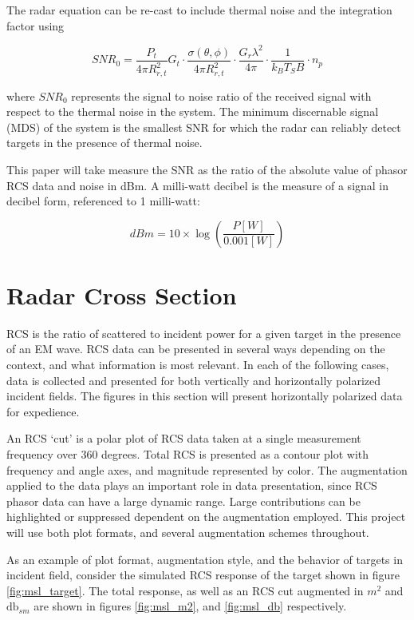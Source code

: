 	The radar equation can be re-cast to include thermal noise and the integration factor using

	\begin{equation}\label{eq:re_snr}
		SNR_0 = \frac{P_t}{4 \pi R_{r, t}^2}G_t
		\cdot \frac{\sigma(\theta, \phi)}{4 \pi R_{r, t}^2}
		\cdot \frac{G_r \lambda^2}{4 \pi}
		\cdot \frac{1}{k_B T_S B}
		\cdot n_p
	\end{equation}

	where $SNR_0$ represents the signal to noise ratio of the received signal with respect to the thermal noise in the system. The minimum discernable signal (MDS) of the system is the smallest SNR for which the radar can reliably detect targets in the presence of thermal noise.

	This paper will take measure the SNR as the ratio of the absolute value of phasor RCS data and noise in \gls{dBm}. A milli-watt decibel is the measure of a signal in decibel form, referenced to 1 milli-watt:

	\begin{equation}
		dBm = 10 \times \log(\frac{P [W]}{0.001 [W]})
	\end{equation}

\section{Radar Cross Section}

	RCS is the ratio of scattered to incident power for a given target in the presence of an EM wave. RCS data can be presented in several ways depending on the context, and what information is most relevant. In each of the following cases, data is collected and presented for both vertically and horizontally polarized incident fields. The figures in this section will present horizontally polarized data for expedience.

	An RCS `cut' is a polar plot of RCS data taken at a single measurement frequency over 360 degrees. Total RCS is presented as a contour plot with frequency and angle axes, and magnitude represented by color. The augmentation applied to the data plays an important role in data presentation, since RCS phasor data can have a large dynamic range. Large contributions can be highlighted or suppressed dependent on the augmentation employed. This project will use both plot formats, and several augmentation schemes throughout.

	As an example of plot format, augmentation style, and the behavior of targets in incident field, consider the simulated RCS response of the target shown in figure \ref{fig:msl_target}. The total response, as well as an RCS cut augmented in $m^2$ and $\textrm{db}_{sm}$ are shown in figures \ref{fig:msl_m2}, and \ref{fig:msl_db} respectively.

